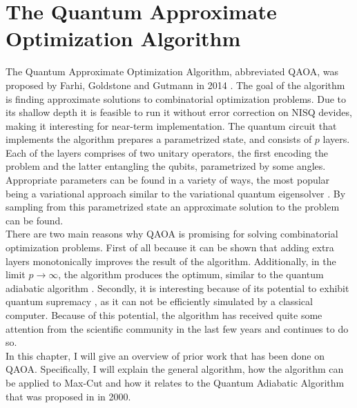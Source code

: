 \chapter{The Quantum Approximate Optimization Algorithm}
\label{chap:qaoa}

The Quantum Approximate Optimization Algorithm, abbreviated QAOA, was proposed by Farhi, Goldstone and Gutmann in 2014 \cite{FGG14}. The goal of the algorithm is finding approximate solutions to combinatorial optimization problems. Due to its shallow depth it is feasible to run it without error correction on NISQ devides, making it interesting for near-term implementation. The quantum circuit that implements the algorithm prepares a parametrized state, and consists of $p$ layers. Each of the layers comprises of two unitary operators, the first encoding the problem and the latter entangling the qubits, parametrized by some angles. Appropriate parameters can be found in a variety of ways, the most popular being a variational approach similar to the variational quantum eigensolver \cite{VQE}. By sampling from this parametrized state an approximate solution to the problem can be found.
\\

There are two main reasons why QAOA is promising for solving combinatorial optimization problems. First of all because it can be shown that adding extra layers monotonically improves the result of the algorithm. Additionally, in the limit $p \to \infty$, the algorithm produces the optimum, similar to the quantum adiabatic algorithm \cite{FGG14}. Secondly, it is interesting because of its potential to exhibit quantum supremacy \cite{FH16}, as it can not be efficiently simulated by a classical computer. Because of this potential, the algorithm has received quite some attention from the scientific community in the last few years and continues to do so.
\\

In this chapter, I will give an overview of prior work that has been done on QAOA. Specifically, I will explain the general algorithm, how the algorithm can be applied to Max-Cut and how it relates to the Quantum Adiabatic Algorithm that was proposed in \cite{FGGS2000} in 2000. 

